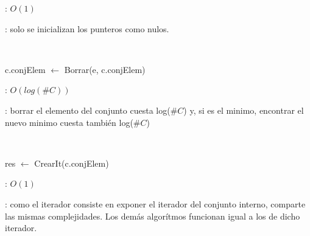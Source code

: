 \begin{Algoritmos}
	\complejidad: $O(1)$

	\justifcomp: solo se inicializan los punteros como nulos.

	~

	\begin{algorithm}[H]
		\NoCaptionOfAlgo
		\caption{}
		c.conjElem $\leftarrow$ Borrar(e, c.conjElem)
	\end{algorithm}

	\complejidad: $O(log(\#C))$

	\justifcomp: borrar el elemento del conjunto cuesta log($\#C$) y, si es el minimo, encontrar el nuevo minimo cuesta también log($\#C$)

	~


	\begin{algorithm}[H]
		\NoCaptionOfAlgo
		\caption{}
		res $\leftarrow$ CrearIt(c.conjElem)
	\end{algorithm}

	\complejidad: $O(1)$

	\justifcomp: como el iterador consiste en exponer el iterador del conjunto interno, comparte las mismas complejidades. Los demás algorítmos funcionan igual a los de dicho iterador.

\end{Algoritmos}